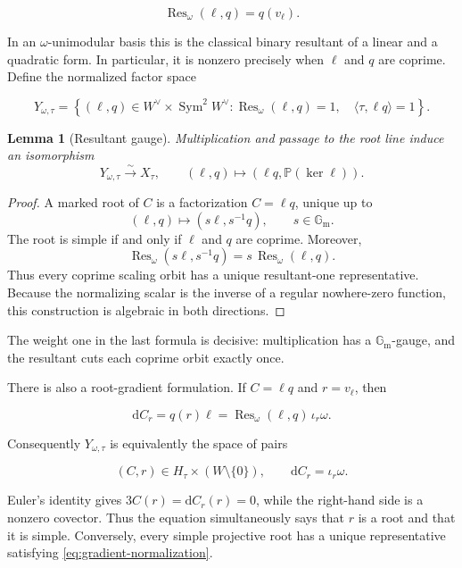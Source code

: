\documentclass[11pt,a4paper]{article}
\newtheorem{lemma}[theorem]{Lemma}
\theoremstyle{remark}
\DeclareMathOperator{\Sym}{Sym}
\DeclareMathOperator{\Res}{Res}
\newcommand{\Gm}{\mathbb G_{\mathrm m}}
\newcommand{\PP}{\mathbb P}
\newcommand{\dd}{\mathrm d}
\begin{document}
\[
  \Res_\omega(\ell,q)=q(v_\ell).
\]

In an $\omega$-unimodular basis this is the classical binary resultant of a
linear and a quadratic form.  In particular, it is nonzero precisely when
$\ell$ and $q$ are coprime.  Define the normalized factor space

\begin{equation}\label{eq:Y}
  Y_{\omega,\tau}=
  \left\{(\ell,q)\in W^\vee\times\Sym^2W^\vee:
  \Res_\omega(\ell,q)=1,\quad
  \langle\tau,\ell q\rangle=1\right\}.
\end{equation}

\begin{lemma}[Resultant gauge]\label{lem:gauge}
Multiplication and passage to the root line induce an isomorphism
\[
  Y_{\omega,\tau}\xrightarrow{\sim}X_\tau,
  \qquad
  (\ell,q)\longmapsto(\ell q,\PP(\ker\ell)).
\]
\end{lemma}

\begin{proof}
A marked root of $C$ is a factorization $C=\ell q$, unique up to
\[
  (\ell,q)\longmapsto(s\ell,s^{-1}q),\qquad s\in\Gm.
\]
The root is simple if and only if $\ell$ and $q$ are coprime.  Moreover,
\[
  \Res_\omega(s\ell,s^{-1}q)
  =s\,\Res_\omega(\ell,q).
\]
Thus every coprime scaling orbit has a unique resultant-one representative.
Because the normalizing scalar is the inverse of a regular nowhere-zero
function, this construction is algebraic in both directions.
\end{proof}

The weight one in the last formula is decisive: multiplication has a
$\Gm$-gauge, and the resultant cuts each coprime orbit exactly once.

There is also a root-gradient formulation.  If $C=\ell q$ and
$r=v_\ell$, then

\[
  \dd C_r=q(r)\ell
  =\Res_\omega(\ell,q)\,\iota_r\omega.
\]

Consequently $Y_{\omega,\tau}$ is equivalently the space of pairs

\begin{equation}\label{eq:gradient-normalization}
  (C,r)\in H_\tau\times(W\setminus\{0\}),
  \qquad \dd C_r=\iota_r\omega.
\end{equation}

Euler's identity gives $3C(r)=\dd C_r(r)=0$, while the right-hand side is a
nonzero covector.  Thus the equation simultaneously says that $r$ is a root
and that it is simple.  Conversely, every simple projective root has a unique
representative satisfying \eqref{eq:gradient-normalization}.
\end{document}
